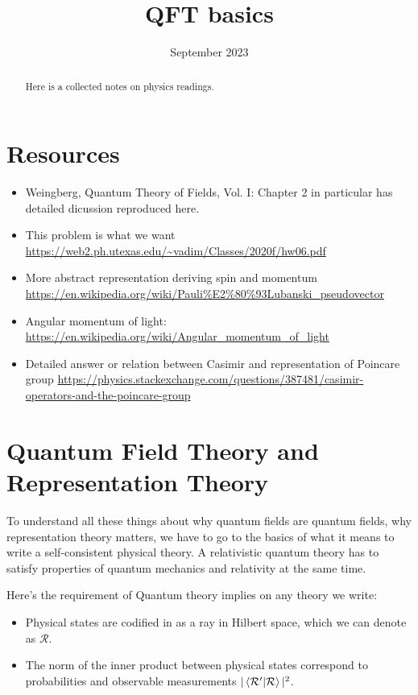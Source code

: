 \documentclass[12pt]{scrartcl}
\begin{document}
\title{QFT basics} %
\date{September 2023}
\maketitle

\begin{abstract}
	\sffamily\small
	Here is a collected notes on physics readings.
\end{abstract}

\vspace{1em}

\tableofcontents
\newpage


\section{Resources}
\begin{itemize}
	\item Weingberg, Quantum Theory of Fields, Vol. I:  Chapter 2 in particular has detailed dicussion reproduced here.
	
	\item This problem is what we want \url{https://web2.ph.utexas.edu/~vadim/Classes/2020f/hw06.pdf}
	\item More abstract representation deriving spin and momentum \url{https://en.wikipedia.org/wiki/Pauli%E2%80%93Lubanski_pseudovector}
	
	\item Angular momentum of light: \url{https://en.wikipedia.org/wiki/Angular_momentum_of_light}
	\item Detailed answer or relation between Casimir and representation of Poincare group \url{https://physics.stackexchange.com/questions/387481/casimir-operators-and-the-poincare-group}
\end{itemize}


\section{Quantum Field Theory and Representation Theory}
To understand all these things about why quantum fields are quantum fields, why representation theory matters, we have to go to the basics of what it means to write a self-consistent physical theory.  A relativistic quantum theory has to satisfy properties of quantum mechanics and relativity at the same time.

Here's the requirement of Quantum theory implies on any theory we write:
\begin{itemize}
\item Physical states are codified in as a ray in Hilbert space, which we can denote as $\mathcal{R}$.
\item The norm of the inner product between physical states correspond to probabilities and observable measurements $|\braket{\mathcal{R}' | \mathcal{R}}|^2$.
\end{itemize}
\end{document}
